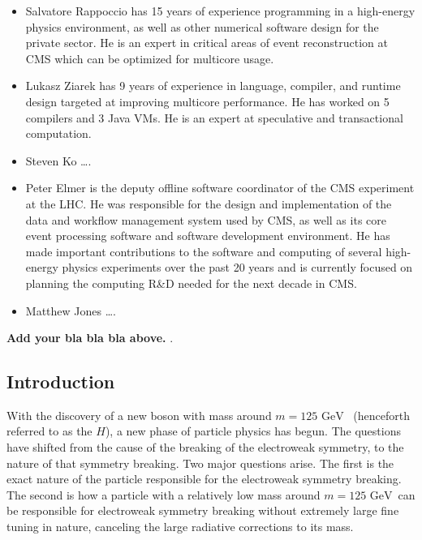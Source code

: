 \documentclass[12pt]{article}
\newcommand{\GeV}{\ensuremath{\mathrm{GeV}}}
\begin{document}
\begin{itemize}
\item Salvatore Rappoccio has 15 years of experience programming in a
high-energy physics environment, as well as other numerical software
design for the private sector. He is an expert in critical
areas of event reconstruction at CMS which can be optimized for
multicore usage. 
\item Lukasz Ziarek has 9 years of experience in language, compiler, and runtime design
targeted at improving multicore performance.  He has worked on 5 compilers and 3 Java VMs. He
is an expert at speculative and transactional computation.
\item Steven Ko \ldots. 
\item Peter Elmer is the deputy offline software coordinator of the CMS
experiment at the LHC. He was responsible for the design and implementation
of the data and workflow management system used by CMS, as well as its core
event processing software and software development environment. He has
made important contributions to the software and computing of several 
high-energy physics experiments over the past 20 years and is currently
focused on planning the computing R\&D needed for the next decade in CMS.
\item Matthew Jones \ldots.  
\end{itemize}




\bigskip

{\bf Add your bla bla bla above. }. 


\clearpage

\subsection{Introduction}

With the discovery of a new boson with mass around $m=125$
\GeV ~\cite{higgs_cms,higgs_atlas} (henceforth referred to as the
$H$), a new phase of particle physics
has begun. The questions have shifted from the cause of the breaking
of the electroweak symmetry, to the nature of that symmetry
breaking. Two major questions arise. The first is the exact nature of
the particle responsible for the electroweak symmetry breaking. The
second is how a particle with a relatively low mass around $m=125$ \GeV\ 
can be responsible for electroweak symmetry breaking 
without extremely large fine tuning in nature, canceling
the large radiative corrections to its mass. 
\end{document}
